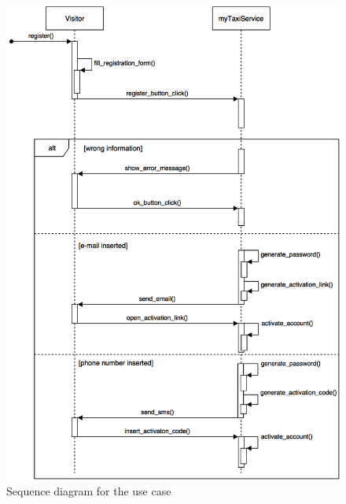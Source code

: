 \documentclass[a4paper,12pt,dvipsnames]{article}%
\begin{document}
\begin{figure}[H]
\centering
\includegraphics[scale=.3]{Registration.png}
\caption{Sequence diagram for the use case}
\end{figure}
\break
\end{document}
